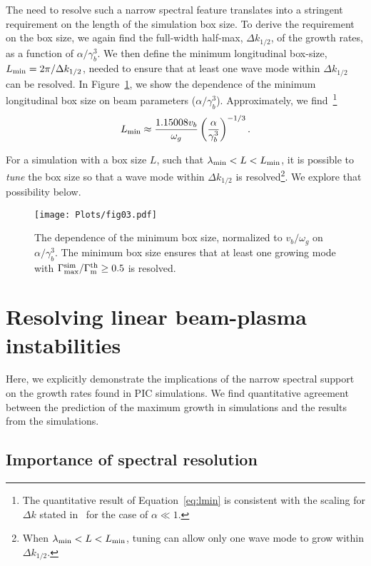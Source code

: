 \documentclass[pop,numberedappendix,iop]{aeb_emulateapj_2015}
\begin{document}
The need to resolve such a narrow spectral feature translates into a stringent requirement on the length of the simulation box size.
To derive the requirement on the box size, we again find the full-width half-max, $\Delta k_{1/2}$, of the growth rates, as a function of $\alpha/\gamma^3_b$. 
We then define the minimum longitudinal box-size, $L_{\rm min}=2 \pi / \Delta k_{1/2}$, needed to ensure that at least one wave mode within $\Delta k_{1/2}$ can be resolved. In Figure~\ref{fig:lmin}, we show the dependence of the minimum longitudinal box size on beam parameters ($\alpha/\gamma_b^3$).
Approximately, we find~\footnote{
The quantitative result of Equation~\eqref{eq:lmin} is consistent with the scaling for $\Delta k$ stated in~\citep{fainberg+1969} for the case of $\alpha \ll 1$.
}
\begin{equation}
\label{eq:lmin}
L_{\rm min}
\approx 
\frac{  1.15008  v_b}{\omega_g} \left(\frac{\alpha }{\gamma _b^3}\right)^{-1/3}.
\end{equation}

For a simulation with a box size $L$, such that $\lambda_{\rm min} < L<L_{\rm min}$, it is possible to {\it tune} the box size so that a wave mode within $\Delta k_{1/2}$ is resolved\footnote{When $\lambda_{\rm min} <L<L_{\rm min}$, tuning can allow only one wave mode to grow within $\Delta k_{1/2}$.}.
We explore that possibility below.


\begin{figure}
\center
\texttt{[image: Plots/fig03.pdf]}
\caption{
The dependence of the minimum box size, normalized to $v_b/\omega_g$ on $\alpha/\gamma^3_b$. The minimum box size ensures that at least one growing mode with  $\Gamma^{\rm sim}_{\rm max} / \Gamma^{\rm th}_{\rm m} \geq 0.5 $ is resolved.
\label{fig:lmin}}
\end{figure}


\section{Resolving linear beam-plasma instabilities}
\label{sec:simulations}



Here, we explicitly demonstrate the implications of the narrow spectral support on the growth rates found in PIC simulations. 
We find quantitative agreement between the prediction of the maximum growth in simulations and the results from the simulations.


\subsection{Importance of spectral resolution}
\end{document}
